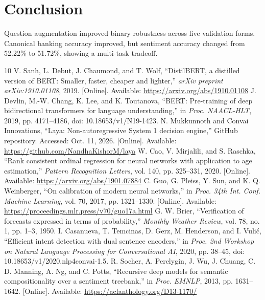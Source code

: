 \documentclass[conference]{IEEEtran}
\begin{document}
\section{Conclusion}
Question augmentation improved binary robustness across five validation forms. Canonical banking accuracy improved, but sentiment accuracy changed from 52.22\% to 51.72\%, showing a multi-task tradeoff.
\begin{thebibliography}{10}
V. Sanh, L. Debut, J. Chaumond, and T. Wolf, ``DistilBERT, a distilled version of BERT: Smaller, faster, cheaper and lighter,'' \emph{arXiv preprint arXiv:1910.01108}, 2019. [Online]. Available: \url{https://arxiv.org/abs/1910.01108}
J. Devlin, M.-W. Chang, K. Lee, and K. Toutanova, ``BERT: Pre-training of deep bidirectional transformers for language understanding,'' in \emph{Proc. NAACL-HLT}, 2019, pp. 4171--4186, doi: 10.18653/v1/N19-1423.
N. Mukkunnoth and Convai Innovations, ``Laya: Non-autoregressive System 1 decision engine,'' GitHub repository. Accessed: Oct. 11, 2026. [Online]. Available: \url{https://github.com/NandhaKishorM/laya}
W. Cao, V. Mirjalili, and S. Raschka, ``Rank consistent ordinal regression for neural networks with application to age estimation,'' \emph{Pattern Recognition Letters}, vol. 140, pp. 325--331, 2020. [Online]. Available: \url{https://arxiv.org/abs/1901.07884}
C. Guo, G. Pleiss, Y. Sun, and K. Q. Weinberger, ``On calibration of modern neural networks,'' in \emph{Proc. 34th Int. Conf. Machine Learning}, vol. 70, 2017, pp. 1321--1330. [Online]. Available: \url{https://proceedings.mlr.press/v70/guo17a.html}
G. W. Brier, ``Verification of forecasts expressed in terms of probability,'' \emph{Monthly Weather Review}, vol. 78, no. 1, pp. 1--3, 1950.
I. Casanueva, T. Temcinas, D. Gerz, M. Henderson, and I. Vuli\'{c}, ``Efficient intent detection with dual sentence encoders,'' in \emph{Proc. 2nd Workshop on Natural Language Processing for Conversational AI}, 2020, pp. 38--45, doi: 10.18653/v1/2020.nlp4convai-1.5.
R. Socher, A. Perelygin, J. Wu, J. Chuang, C. D. Manning, A. Ng, and C. Potts, ``Recursive deep models for semantic compositionality over a sentiment treebank,'' in \emph{Proc. EMNLP}, 2013, pp. 1631--1642. [Online]. Available: \url{https://aclanthology.org/D13-1170/}
\end{thebibliography}
\end{document}
